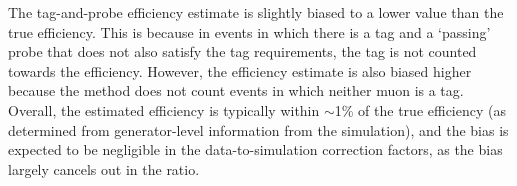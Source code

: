 The tag-and-probe efficiency estimate is slightly biased to a lower value than 
the true efficiency. This is because in events in which there is a tag and a 
`passing' probe that does not also satisfy the tag requirements, the tag is not 
counted towards the efficiency. 
However, the efficiency estimate is also biased 
higher because the method does not count events in which neither muon is a tag. 
Overall, the estimated efficiency is typically within $\sim$1\% 
of the true efficiency (as determined from generator-level information from the 
simulation), and the bias is expected to be negligible in the 
data-to-simulation correction factors, as the bias largely cancels out in the 
ratio.

